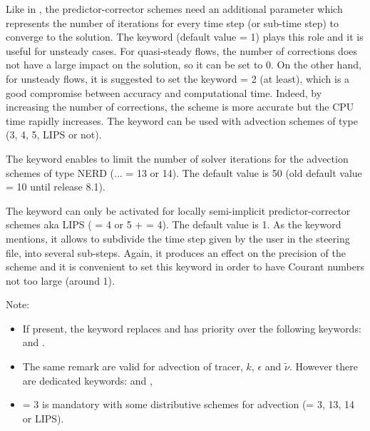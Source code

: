 Like in , the predictor-corrector schemes need an additional
parameter which represents the number of iterations for every time step
(or sub-time step) to converge to the solution.
The keyword 
(default value = 1) plays this role and it is useful for unsteady cases.
For quasi-steady flows, the number of corrections does not have a large impact
on the solution, so it can be set to 0.
On the other hand, for unsteady flows, it is suggested to set the keyword
 = 2 (at least),
which is a good compromise between accuracy and computational time.
Indeed, by increasing the number of corrections, the scheme is more accurate but
the CPU time rapidly increases.
The keyword  can be used
with advection schemes of type (3, 4, 5, LIPS or not).

The keyword 
enables to limit the number of solver iterations for the advection schemes
of type NERD (... = 13 or 14).
The default value is 50 (old default value = 10 until release 8.1).

The keyword  can only be
activated for locally semi-implicit predictor-corrector schemes aka LIPS
( = 4 or 5
+  = 4).
The default value is 1.
As the keyword mentions, it allows to subdivide the time step given by the user
in the steering file, into several sub-steps.
Again, it produces an effect on the precision of the scheme and it is convenient
to set this keyword in order to have Courant numbers not too large (around 1).


\begin{WarningBlock}{Note:}
\begin{itemize}

\item If present, the keyword 
replaces and has priority over the following keywords:
 and .

\item The same remark are valid for advection of tracer, $k$, $\epsilon$ and
$\tilde{\nu}$.
However there are dedicated keywords: 
and ,

\item {} = 3 is mandatory with some distributive schemes
for advection (= 3, 13, 14 or LIPS).
\end{itemize}
\end{WarningBlock}

